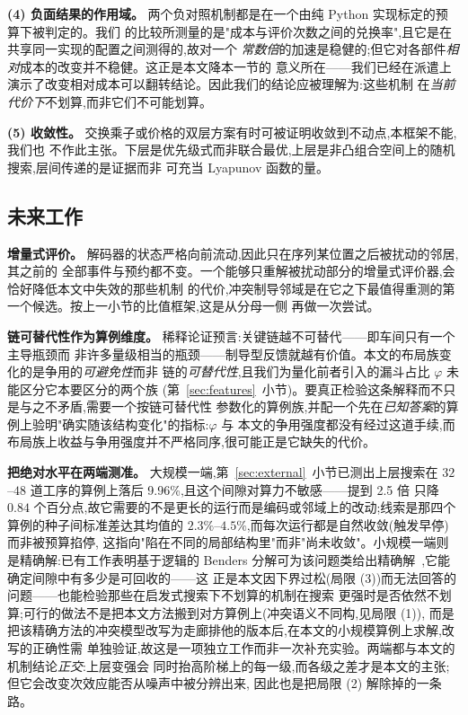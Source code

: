 \documentclass[manuscript,screen,review]{acmart}
\newcommand{\PubGapBig}{9.96\%}           %
\newcommand{\PubBudgetRatio}{2.5}
\newcommand{\PubBudgetGainPP}{0.84}       %
\newcommand{\PubCvBig}{$2.3\%$--$4.5\%$} %
\begin{document}
\textbf{(4) 负面结果的作用域。} 两个负对照机制都是在一个由纯 Python 实现标定的预算下被判定的。我们
的比较所测量的是"成本与评价次数之间的兑换率",且它是在共享同一实现的配置之间测得的,故对一个
\emph{常数倍}的加速是稳健的;但它对各部件\emph{相对}成本的改变并不稳健。这正是本文降本一节的
意义所在——我们已经在派遣上演示了改变相对成本可以翻转结论。因此我们的结论应被理解为:这些机制
在\emph{当前代价下}不划算,而非它们不可能划算。

\textbf{(5) 收敛性。} 交换乘子或价格的双层方案有时可被证明收敛到不动点,本框架不能,我们也
不作此主张。下层是优先级式而非联合最优,上层是非凸组合空间上的随机搜索,层间传递的是证据而非
可充当 Lyapunov 函数的量。

\subsection{未来工作}
\label{sec:future_work}

\textbf{增量式评价。} 解码器的状态严格向前流动,因此只在序列某位置之后被扰动的邻居,其之前的
全部事件与预约都不变。一个能够只重解被扰动部分的增量式评价器,会恰好降低本文中失效的那些机制
的代价,冲突制导邻域是在它之下最值得重测的第一个候选。按上一小节的比值框架,这是从分母一侧
再做一次尝试。

\textbf{链可替代性作为算例维度。} 稀释论证预言:关键链越不可替代——即车间只有一个主导瓶颈而
非许多量级相当的瓶颈——制导型反馈就越有价值。本文的布局族变化的是争用的\emph{可避免性}而非
链的\emph{可替代性},且我们为量化前者引入的漏斗占比 $\varphi$ 未能区分它本要区分的两个族
(第~\ref{sec:features}~小节)。要真正检验这条解释而不只是与之不矛盾,需要一个按链可替代性
参数化的算例族,并配一个先在\emph{已知答案}的算例上验明"确实随该结构变化"的指标:$\varphi$ 与
本文的争用强度都没有经过这道手续,而布局族上收益与争用强度并不严格同序,很可能正是它缺失的代价。

\textbf{把绝对水平在两端测准。} 大规模一端,第~\ref{sec:external}~小节已测出上层搜索在
$32$--$48$ 道工序的算例上落后 \PubGapBig{},且这个间隙对算力不敏感——提到 \PubBudgetRatio{} 倍
只降 $\PubBudgetGainPP$ 个百分点,故它需要的不是更长的运行而是编码或邻域上的改动;线索是那四个
算例的种子间标准差达其均值的 \PubCvBig{},而每次运行都是自然收敛(触发早停)而非被预算掐停,
这指向"陷在不同的局部结构里"而非"尚未收敛"。小规模一端则是精确解:已有工作表明基于逻辑的
Benders 分解可为该问题类给出精确解~\cite{vanos2026exact},它能确定间隙中有多少是可回收的——这
正是本文因下界过松(局限 (3))而无法回答的问题——也能检验那些在启发式搜索下不划算的机制在搜索
更强时是否依然不划算;可行的做法不是把本文方法搬到对方算例上(冲突语义不同构,见局限 (1)),
而是把该精确方法的冲突模型改写为走廊排他的版本后,在本文的小规模算例上求解,改写的正确性需
单独验证,故这是一项独立工作而非一次补充实验。两端都与本文的机制结论\emph{正交}:上层变强会
同时抬高阶梯上的每一级,而各级之差才是本文的主张;但它会改变次效应能否从噪声中被分辨出来,
因此也是把局限 (2) 解除掉的一条路。
\end{document}
